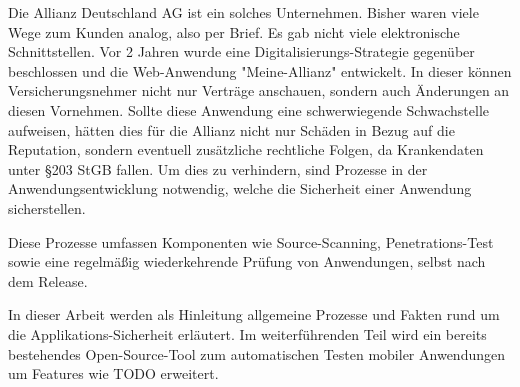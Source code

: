 Die Allianz Deutschland AG ist ein solches Unternehmen. Bisher waren viele Wege zum Kunden analog, also per Brief. Es gab nicht viele elektronische Schnittstellen. Vor 2 Jahren wurde eine Digitalisierungs-Strategie gegenüber beschlossen und die Web-Anwendung "Meine-Allianz" entwickelt. In dieser können Versicherungsnehmer nicht nur Verträge anschauen, sondern auch Änderungen an diesen Vornehmen. Sollte diese Anwendung eine schwerwiegende Schwachstelle aufweisen, hätten dies für die Allianz nicht nur Schäden in Bezug auf die Reputation, sondern eventuell zusätzliche rechtliche Folgen, da Krankendaten unter §203 StGB fallen. Um dies zu verhindern, sind Prozesse in der Anwendungsentwicklung notwendig, welche die Sicherheit einer Anwendung sicherstellen.

Diese Prozesse umfassen Komponenten wie Source-Scanning, Penetrations-Test sowie eine regelmäßig wiederkehrende Prüfung von Anwendungen, selbst nach dem Release.

In dieser Arbeit werden als Hinleitung allgemeine Prozesse und Fakten rund um die Applikations-Sicherheit erläutert. Im weiterführenden Teil wird ein bereits bestehendes Open-Source-Tool zum automatischen Testen mobiler Anwendungen um Features wie TODO erweitert.

